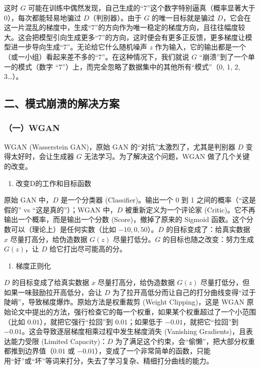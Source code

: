 这时 \(G\) 可能在训练中偶然发现，自己生成的``7''这个数字特别逼真（概率显著大于 \(0\)），每次都能轻易地骗过 \(D\)（判别器）。由于 \(G\) 的唯一目标就是骗过 \(D\)，它会在这一片混乱的梯度中，生成``7''的方向作为唯一稳定的梯度方向，且往往幅度较大。这会把模型引向生成更多``7''的方向，这时便会有更多正反馈，更多梯度让模型进一步导向生成``7''。无论给它什么随机噪声 \(z\) 作为输入，它的输出都是一个（或一小组）看起来差不多的``7''。在这种情况下，我们就说 \(G\) ``崩溃''到了一个单一的模式（数字 ``7''）上，而完全忽略了数据集中的其他所有``模式''（0, 1, 2, 3\ldots）。

\hypertarget{ux4e8cux6a21ux5f0fux5d29ux6e83ux7684ux89e3ux51b3ux65b9ux6848}{%
\subsection{二、模式崩溃的解决方案}\label{ux4e8cux6a21ux5f0fux5d29ux6e83ux7684ux89e3ux51b3ux65b9ux6848}}

\hypertarget{ux4e00wgan}{%
\subsubsection{（一）WGAN}\label{ux4e00wgan}}

WGAN (Wasserstein GAN)，原始 GAN 的``对抗''太激烈了，尤其是判别器 \(D\) 变得太好时，会让生成器 \(G\) 无法学习。为了解决这个问题，WGAN 做了几个关键的改变。

\begin{enumerate}
\def\labelenumi{\arabic{enumi}.}
\tightlist
\item
  改变D的工作和目标函数
\end{enumerate}

原始 GAN 中，\(D\) 是一个分类器 (Classifier)。输出一个 0 到 1 之间的概率（``这是假的'' vs ``这是真的''）；WGAN 中，\(D\) 被重新定义为一个评论家 (Critic)。它不再输出一个概率，而是输出一个分数 (Score)，撤掉了原来的 Sigmoid 函数。这个分数可以（理论上）是任何实数（比如 \(-10, 0, 50\)）。\(D\) 的目标变成了：给真实数据 \(x\) 尽量打高分，给伪造数据 \(G(z)\) 尽量打低分。\(G\) 的目标也随之改变：努力生成 \(G(z)\)，让 \(D\) 给它打出尽可能高的分。

\begin{enumerate}
\def\labelenumi{\arabic{enumi}.}
\setcounter{enumi}{1}
\tightlist
\item
  梯度正则化
\end{enumerate}

\(D\) 的目标变成了给真实数据 \(x\) 尽量打高分，给伪造数据 \(G(z)\) 尽量打低分，但如果一味鼓励拉开高低分，会让 \(D\) 为了拉开高低分而让自己的打分曲线变得``过于陡峭''，导致梯度爆炸。原始方法是权重裁剪 (Weight Clipping)，这是 WGAN 原始论文中提出的方法，强行检查它的每一个权重，如果某个权重超过了一个小范围（比如 \(0.01\)），就把它强行``拉回''到 \(0.01\)；如果低于 \(-0.01\)，就把它``拉回''到 \(-0.01\)。这会导致逐层梯度相乘过程中发生梯度消失 (Vanishing Gradients)，且表达能力受限 (Limited Capacity)：\(D\) 为了满足这个约束，会``偷懒''，把大部分权重都推到边界值（\(0.01\) 或 \(-0.01\)），变成了一个非常简单的函数，只能用``好''或``坏''等词来打分，失去了学习复杂、精细打分曲线的能力。

